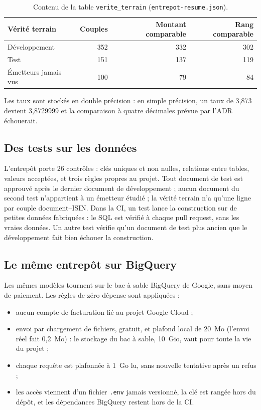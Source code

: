 \documentclass[11pt,a4paper]{article}
\begin{document}
\begin{table}[H]
\small
\begin{tabularx}{\linewidth}{Yrrr}
\toprule
\textbf{Vérité terrain} & \textbf{Couples} & \textbf{Montant comparable} & \textbf{Rang comparable} \\
\midrule
Développement & 352 & 332 & 302 \\
Test & 151 & 137 & 119 \\
Émetteurs jamais vus & 100 & 79 & 84 \\
\bottomrule
\end{tabularx}
\caption{Contenu de la table \texttt{verite\_terrain} (\texttt{entrepot-resume.json}).}
\end{table}

Les taux sont stockés en double précision : en simple précision, un taux de 3,873 devient 3,8729999 et la comparaison à quatre décimales prévue par l'ADR échouerait.

\subsection{Des tests sur les données}

L'entrepôt porte 26 contrôles : clés uniques et non nulles, relations entre tables, valeurs acceptées, et trois règles propres au projet. Tout document de test est approuvé après le dernier document de développement ; aucun document du second test n'appartient à un émetteur étudié ; la vérité terrain n'a qu'une ligne par couple document--ISIN. Dans la CI, un test lance la construction sur de petites données fabriquées : le SQL est vérifié à chaque pull request, sans les vraies données. Un autre test vérifie qu'un document de test plus ancien que le développement fait bien échouer la construction.

\subsection{Le même entrepôt sur BigQuery}

Les mêmes modèles tournent sur le bac à sable BigQuery de Google, sans moyen de paiement. Les règles de zéro dépense sont appliquées :

\begin{itemize}
  \item aucun compte de facturation lié au projet Google Cloud ;
  \item envoi par chargement de fichiers, gratuit, et plafond local de 20~Mo (l'envoi réel fait 0,2~Mo) : le stockage du bac à sable, 10~Gio, vaut pour toute la vie du projet ;
  \item chaque requête est plafonnée à 1~Go lu, sans nouvelle tentative après un refus ;
  \item les accès viennent d'un fichier \texttt{.env} jamais versionné, la clé est rangée hors du dépôt, et les dépendances BigQuery restent hors de la CI.
\end{itemize}
\end{document}
